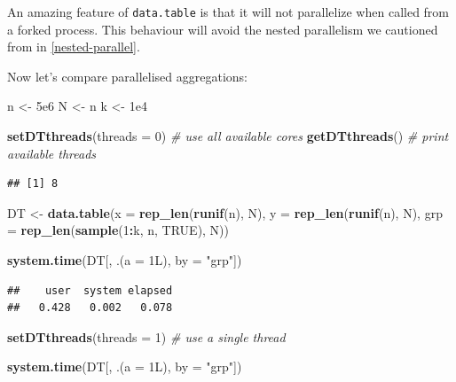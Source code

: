 \documentclass[]{book}
\newenvironment{Shaded}{\begin{snugshade}}{\end{snugshade}}
\newcommand{\CommentTok}[1]{\textcolor[rgb]{0.56,0.35,0.01}{\textit{#1}}}
\newcommand{\DataTypeTok}[1]{\textcolor[rgb]{0.13,0.29,0.53}{#1}}
\newcommand{\DecValTok}[1]{\textcolor[rgb]{0.00,0.00,0.81}{#1}}
\newcommand{\FloatTok}[1]{\textcolor[rgb]{0.00,0.00,0.81}{#1}}
\newcommand{\KeywordTok}[1]{\textcolor[rgb]{0.13,0.29,0.53}{\textbf{#1}}}
\newcommand{\NormalTok}[1]{#1}
\newcommand{\OperatorTok}[1]{\textcolor[rgb]{0.81,0.36,0.00}{\textbf{#1}}}
\newcommand{\OtherTok}[1]{\textcolor[rgb]{0.56,0.35,0.01}{#1}}
\newcommand{\StringTok}[1]{\textcolor[rgb]{0.31,0.60,0.02}{#1}}
\theoremstyle{definition}
\theoremstyle{definition}
\theoremstyle{definition}
\theoremstyle{remark}
\let\BeginKnitrBlock\begin \let\EndKnitrBlock\end
\begin{document}
\BeginKnitrBlock{remark}
{}An amazing feature of \texttt{data.table} is that it will not parallelize when called from a forked process.
This behaviour will avoid the nested parallelism we cautioned from in \ref{nested-parallel}.
\EndKnitrBlock{remark}

Now let's compare parallelised aggregations:

\begin{Shaded}
\begin{Highlighting}[]
\NormalTok{n <-}\StringTok{  }\FloatTok{5e6}
\NormalTok{N <-}\StringTok{ }\NormalTok{n}
\NormalTok{k <-}\StringTok{  }\FloatTok{1e4}

\KeywordTok{setDTthreads}\NormalTok{(}\DataTypeTok{threads =} \DecValTok{0}\NormalTok{) }\CommentTok{# use all available cores}
\KeywordTok{getDTthreads}\NormalTok{() }\CommentTok{# print available threads}
\end{Highlighting}
\end{Shaded}

\begin{verbatim}
## [1] 8
\end{verbatim}

\begin{Shaded}
\begin{Highlighting}[]
\NormalTok{DT <-}\StringTok{  }\KeywordTok{data.table}\NormalTok{(}\DataTypeTok{x =} \KeywordTok{rep_len}\NormalTok{(}\KeywordTok{runif}\NormalTok{(n), N),}
                \DataTypeTok{y =} \KeywordTok{rep_len}\NormalTok{(}\KeywordTok{runif}\NormalTok{(n), N),}
                \DataTypeTok{grp =} \KeywordTok{rep_len}\NormalTok{(}\KeywordTok{sample}\NormalTok{(}\DecValTok{1}\OperatorTok{:}\NormalTok{k, n, }\OtherTok{TRUE}\NormalTok{), N))}

\KeywordTok{system.time}\NormalTok{(DT[, .(}\DataTypeTok{a =}\NormalTok{ 1L), }\DataTypeTok{by =} \StringTok{"grp"}\NormalTok{])}
\end{Highlighting}
\end{Shaded}

\begin{verbatim}
##    user  system elapsed 
##   0.428   0.002   0.078
\end{verbatim}

\begin{Shaded}
\begin{Highlighting}[]
\KeywordTok{setDTthreads}\NormalTok{(}\DataTypeTok{threads =} \DecValTok{1}\NormalTok{) }\CommentTok{# use a single thread}

\KeywordTok{system.time}\NormalTok{(DT[, .(}\DataTypeTok{a =}\NormalTok{ 1L), }\DataTypeTok{by =} \StringTok{"grp"}\NormalTok{])}
\end{Highlighting}
\end{Shaded}
\end{document}
